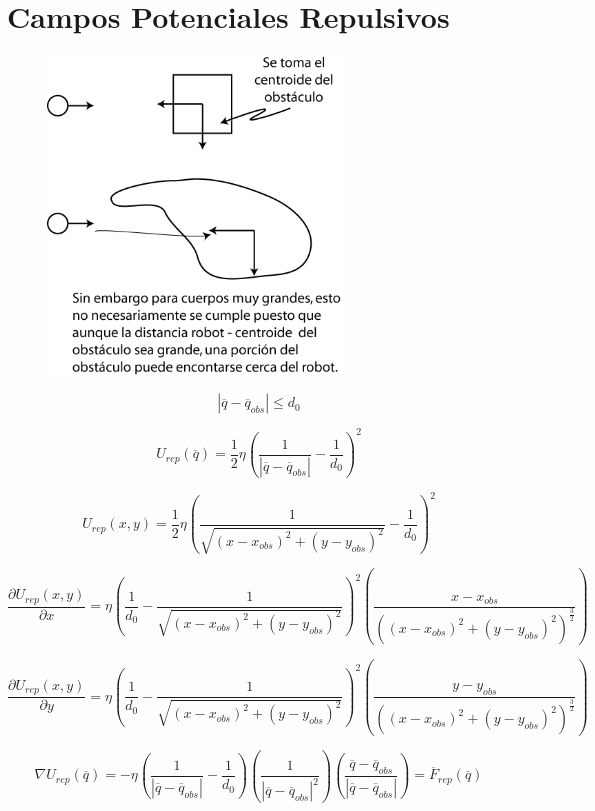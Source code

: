 \section{Campos Potenciales Repulsivos}

\begin{figure}[h!]
	\centering
	\includegraphics[width=0.7\textwidth]{images/img15.png}
	\label{figura15}
\end{figure}
\newpage

$$\left| \overline{q} - \overline{q}_{obs}\right| \leq d_{0}$$

$$U_{rep}(\overline{q}) = \dfrac{1}{2} \eta \left( \dfrac{1}{\left| \overline{q} - \overline{q}_{obs}\right|}  
- \dfrac{1}{d_{0}} \right)^2$$

$$U_{rep}(x,y) = \dfrac{1}{2} \eta \left( \dfrac{1}{\sqrt{(x - x_{obs})^2 + (y - y_{obs})^2}}  
- \dfrac{1}{d_{0}} \right)^2$$

$$\dfrac{\partial U_{rep}(x,y)}{\partial x} = \eta \left( \dfrac{1}{d_{0}}  
-  \dfrac{1}{\sqrt{(x - x_{obs})^2 + (y - y_{obs})^2}} \right)^2 \left( \dfrac{x - x_{obs}}{\left( (x - x_{obs})^2 + (y - y_{obs})^2 \right)^{\frac{3}{2}}} \right)$$

$$\dfrac{\partial U_{rep}(x,y)}{\partial y} = \eta \left( \dfrac{1}{d_{0}}  
-  \dfrac{1}{\sqrt{(x - x_{obs})^2 + (y - y_{obs})^2}} \right)^2 \left( \dfrac{y - y_{obs}}{\left( (x - x_{obs})^2 + (y - y_{obs})^2 \right)^{\frac{3}{2}}} \right)$$

$$\nabla U_{rep}(\overline{q}) = -\eta \left( \dfrac{1}{\left| \overline{q} - \overline{q}_{obs}\right|} - \dfrac{1}{d_{0}} \right)  \left( \dfrac{1}{\left| \overline{q} - \overline{q}_{obs}\right|^2}\right)  \left( \dfrac{\overline{q} - \overline{q}_{obs}}{\left| \overline{q} - \overline{q}_{obs}\right|}\right) = \overline{F}_{rep}(\overline{q})$$

